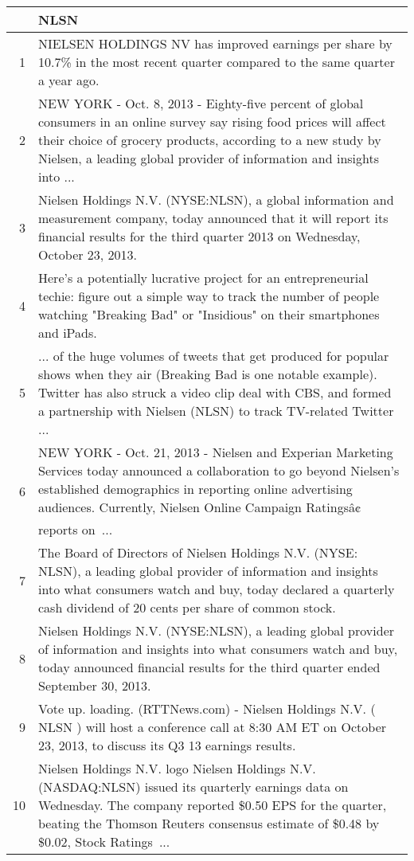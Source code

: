 \documentclass{tufte-handout}\usepackage[]{graphicx}\usepackage[]{color}
\begin{document}
\begin{tabularx}{\textwidth}{rX}
  \hline
 & NLSN \\ 
  \hline
1 &  NIELSEN HOLDINGS NV has improved earnings per share by 10.7\% in the most recent quarter compared to the same quarter a year ago.  \\ 
  2 &  NEW YORK - Oct. 8, 2013 - Eighty-five percent of global consumers in an online survey say rising food prices will affect their choice of grocery products, according to a new study by Nielsen, a leading global provider of information and insights into ...  \\ 
  3 &  Nielsen Holdings N.V. (NYSE:NLSN), a global information and measurement company, today announced that it will report its financial results for the third quarter 2013 on Wednesday, October 23, 2013.  \\ 
  4 &  Here's a potentially lucrative project for an entrepreneurial techie: figure out a simple way to track the number of people watching "Breaking Bad" or "Insidious" on their smartphones and iPads.  \\ 
  5 &  ... of the huge volumes of tweets that get produced for popular shows when they air (Breaking Bad is one notable example). Twitter has also struck a video clip deal with CBS, and formed a partnership with Nielsen (NLSN) to track TV-related Twitter ...  \\ 
  6 &  NEW YORK - Oct. 21, 2013 - Nielsen and Experian Marketing Services today announced a collaboration to go beyond Nielsen's established demographics in reporting online advertising audiences. Currently, Nielsen Online Campaign Ratingsâ¢ reports on ...  \\ 
  7 &  The Board of Directors of Nielsen Holdings N.V. (NYSE: NLSN), a leading global provider of information and insights into what consumers watch and buy, today declared a quarterly cash dividend of 20 cents per share of common stock.  \\ 
  8 &  Nielsen Holdings N.V. (NYSE:NLSN), a leading global provider of information and insights into what consumers watch and buy, today announced financial results for the third quarter ended September 30, 2013.  \\ 
  9 &  Vote up. loading. (RTTNews.com) - Nielsen Holdings N.V. ( NLSN ) will host a conference call at 8:30 AM ET on October 23, 2013, to discuss its Q3 13 earnings results.  \\ 
  10 &  Nielsen Holdings N.V. logo Nielsen Holdings N.V. (NASDAQ:NLSN) issued its quarterly earnings data on Wednesday. The company reported \$0.50 EPS for the quarter, beating the Thomson Reuters consensus estimate of \$0.48 by \$0.02, Stock Ratings ...  \\ 
   \hline
\end{tabularx}
\end{document}
